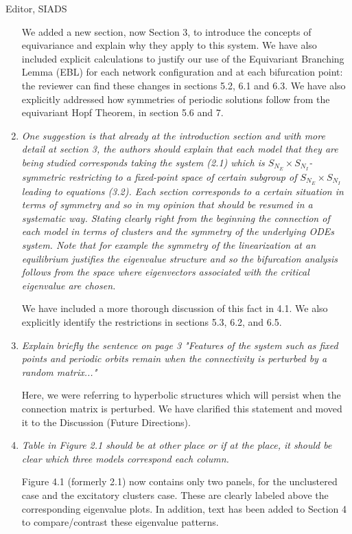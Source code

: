 \documentclass[11pt]{letter}
\begin{document}
\begin{letter}{Editor, SIADS}
\begin{enumerate}
We added a new section, now Section 3, to introduce the concepts of equivariance and explain why they apply to this system. We have also included explicit calculations to justify our use of the Equivariant Branching Lemma (EBL) for each network configuration and at each bifurcation point: the reviewer can find these changes in sections 5.2, 6.1 and 6.3. We have also explicitly addressed how symmetries of periodic solutions follow from the equivariant Hopf Theorem, in section 5.6 and 7.

\item \emph{One suggestion is that already at the introduction section and with more detail at section 3, the authors should explain that each model that they are being studied corresponds taking the system (2.1) which is $S_{N_E} \times S_{N_I}$-symmetric restricting to a fixed-point space of certain subgroup of $S_{N_E} \times S_{N_I}$ leading to equations (3.2). Each section corresponds to a certain situation in terms of symmetry and so in my opinion that should be resumed in a systematic way. Stating clearly right from the beginning the connection of each model in terms of clusters and the symmetry of the underlying ODEs system. Note that for example the symmetry of the linearization at an equilibrium justifies the eigenvalue structure and so the bifurcation analysis follows from the space where eigenvectors associated with the critical eigenvalue are chosen.}
\vspace{4mm}

We have included a more thorough discussion of this fact in 4.1. We also explicitly identify the restrictions in sections 5.3, 6.2, and 6.5.

\item \emph{Explain briefly the sentence on page 3 "Features of the system such as fixed points and periodic orbits remain when the connectivity is perturbed by a random matrix..."}
\vspace{4mm} 

Here, we were referring to hyperbolic structures which will persist when the connection matrix is perturbed. We have clarified this statement and moved it to the Discussion (Future Directions).

\item \emph{Table in Figure 2.1 should be at other place or if at the place, it should be clear which three models correspond each column.}
\vspace{4mm}

Figure 4.1 (formerly 2.1) now contains only two panels, for the unclustered case and the excitatory clusters case. These are clearly labeled above the corresponding eigenvalue plots. In addition, text has been added to Section 4 to compare/contrast these eigenvalue patterns.


\end{enumerate}
\end{letter}
\end{document}
